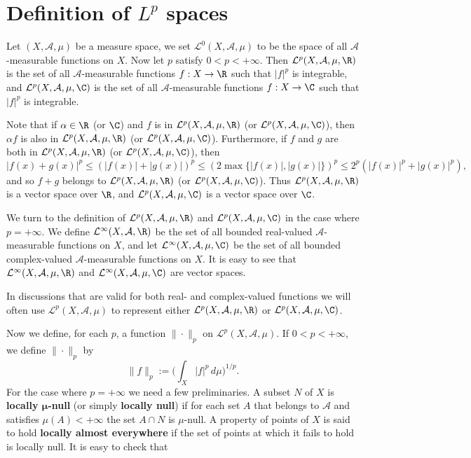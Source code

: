 \section{Definition of $L^p$ spaces}
Let $(X,\mathcal{A},\mu)$ be a measure space, we set $\mathcal{L}^0(X,\mathcal{A},\mu)$ to be the space of all $\mathcal{A}$-measurable functions on $X$. Now let $p$ satisfy $0<p<+\infty$. Then $\mathcal{L}^p(X,\mathcal{A},\mu,\R)$ is the set of all $\mathcal{A}$-measurable functions $f:X\to\R$ such that $|f|^p$ is integrable, and $\mathcal{L}^p(X,\mathcal{A},\mu,\C)$ is the set of all $\mathcal{A}$-measurable functions $f:X\to\C$ such that $|f|^p$ is integrable.\par
Note that if $\alpha\in\R$ (or $\C$) and $f$ is in $\mathcal{L}^p(X,\mathcal{A},\mu,\R)$ (or $\mathcal{L}^p(X,\mathcal{A},\mu,\C)$), then $\alpha f$ is also in $\mathcal{L}^p(X,\mathcal{A},\mu,\R)$ (or $\mathcal{L}^p(X,\mathcal{A},\mu,\C)$). Furthermore, if $f$ and $g$ are both in  $\mathcal{L}^p(X,\mathcal{A},\mu,\R)$ (or $\mathcal{L}^p(X,\mathcal{A},\mu,\C)$), then
\[|f(x)+g(x)|^p\leq(|f(x)|+|g(x)|)^p\leq(2\max\{|f(x)|,|g(x)|\})^p\leq 2^p(|f(x)|^p+|g(x)|^p),\]
and so $f+g$ belongs to $\mathcal{L}^p(X,\mathcal{A},\mu,\R)$ (or $\mathcal{L}^p(X,\mathcal{A},\mu,\C)$). Thus $\mathcal{L}^p(X,\mathcal{A},\mu,\R)$ is a vector space over $\R$, and $\mathcal{L}^p(X,\mathcal{A},\mu,\C)$ is a vector space over $\C$.\par
We turn to the definition of $\mathcal{L}^p(X,\mathcal{A},\mu,\R)$ and $\mathcal{L}^p(X,\mathcal{A},\mu,\C)$ in the case where $p=+\infty$. We define $\mathcal{L}^{\infty}(X,\mathcal{A},\R)$ be the set of all bounded real-valued $\mathcal{A}$-measurable functions on $X$, and let $\mathcal{L}^{\infty}(X,\mathcal{A},\mu,\C)$ be the set of all bounded complex-valued $\mathcal{A}$-measurable functions on $X$. It is easy to see that $\mathcal{L}^{\infty}(X,\mathcal{A},\mu,\R)$ and $\mathcal{L}^{\infty}(X,\mathcal{A},\mu,\C)$ are vector spaces.\par
In discussions that are valid for both real- and complex-valued functions we will often use $\mathcal{L}^p(X,\mathcal{A},\mu)$ to represent either $\mathcal{L}^p(X,\mathcal{A},\mu,\R)$ or $\mathcal{L}^p(X,\mathcal{A},\mu,\C)$.\par
Now we define, for each $p$, a function $\|\cdot\|_p$ on $\mathcal{L}^p(X,\mathcal{A},\mu)$. If $0<p<+\infty$, we define $\|\cdot\|_p$ by
\[\|f\|_p:=\Big(\int_X|f|^p\,d\mu\Big)^{1/p}.\]
For the case where $p=+\infty$ we need a few preliminaries. A subset $N$ of $X$ is \textbf{locally $\bm{\mu}$-null} (or simply \textbf{locally null}) if for each set $A$ that belongs to $\mathcal{A}$ and satisfies $\mu(A)<+\infty$ the set $A\cap N$ is $\mu$-null. A property of points of $X$ is said to hold \textbf{locally almost everywhere} if the set of points at which it fails to hold is locally null. It is easy to check that
